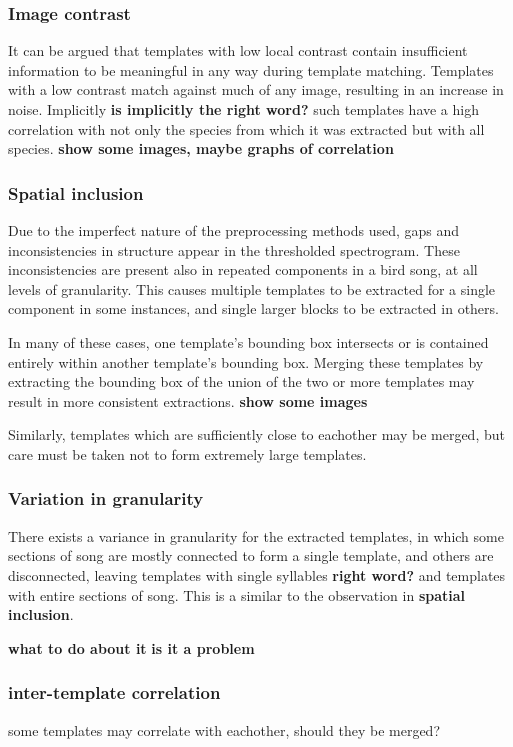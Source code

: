 \subsubsection{Image contrast}
It can be argued that templates with low local contrast contain insufficient
information to be meaningful in any way during template matching.
Templates with a low contrast match against much of any image, resulting in an
increase in noise.
Implicitly \textbf{is implicitly the right word?} such templates have a high
correlation with not only the species from which it was extracted but with all
species.
\textbf{show some images, maybe graphs of correlation}

\subsubsection{Spatial inclusion}
Due to the imperfect nature of the preprocessing methods used, gaps and
inconsistencies in structure appear in the thresholded spectrogram.
These inconsistencies are present also in repeated components in a bird song,
at all levels of granularity.
This causes multiple templates to be extracted for a single component in some
instances, and single larger blocks to be extracted in others.

In many of these cases, one template's bounding box intersects or is contained
entirely within another template's bounding box.
Merging these templates by extracting the bounding box of the union of the two
or more templates may result in more consistent extractions.
\textbf{show some images}

Similarly, templates which are sufficiently close to eachother may be merged,
but care must be taken not to form extremely large templates.

\subsubsection{Variation in granularity}
There exists a variance in granularity for the extracted templates, in which
some sections of song are mostly connected to form a single template, and others
are disconnected, leaving templates with single syllables \textbf{right word?}
and templates with entire sections of song.
This is a similar to the observation in \textbf{spatial inclusion}.

\textbf{what to do about it}
\textbf{is it a problem}


\subsubsection{inter-template correlation}
some templates may correlate with eachother, should they be merged?

